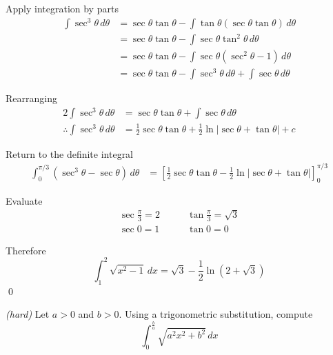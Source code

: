 \begin{solution}
    Apply integration by parts
    \begin{align*}
        \int \sec^3\theta\,d\theta
        &= \sec\theta\tan\theta-\int \tan\theta(\sec\theta\tan\theta)\,d\theta\\
        &= \sec\theta\tan\theta-\int \sec\theta\tan^2\theta\,d\theta\\
        &= \sec\theta\tan\theta-\int \sec\theta(\sec^2\theta-1)\,d\theta\\
        &= \sec\theta\tan\theta-\int \sec^3\theta\,d\theta+\int \sec\theta\,d\theta
    \end{align*}

    Rearranging
    \begin{align*}
        2\int \sec^3\theta\,d\theta
        &= \sec\theta\tan\theta+\int \sec\theta\,d\theta\\
        \therefore \int \sec^3\theta\,d\theta
        &= \frac{1}{2}\sec\theta\tan\theta+\frac{1}{2}\ln|\sec\theta+\tan\theta|+c
    \end{align*}

    Return to the definite integral
    \begin{align*}
        \int_{0}^{\pi/3}(\sec^3\theta-\sec\theta)\,d\theta
        &= \left[\frac{1}{2}\sec\theta\tan\theta-\frac{1}{2}\ln|\sec\theta+\tan\theta|\right]_{0}^{\pi/3}
    \end{align*}

    Evaluate
    \begin{align*}
        \sec\frac{\pi}{3}=2 &\qquad \tan\frac{\pi}{3}=\sqrt{3}\\
        \sec 0=1 &\qquad \tan 0=0
    \end{align*}

    Therefore
    \[
        \int_{1}^{2}\sqrt{x^2-1}\,dx
        = \sqrt{3}-\frac{1}{2}\ln(2+\sqrt{3})
    \]
    \qed
\end{solution}

\begin{example} \emph{(hard)}
    Let $a>0$ and $b>0$. Using a trigonometric substitution, compute
    \[
        \int_{0}^{\frac{b}{a}}\sqrt{a^2x^2+b^2}\,dx
    \]
\end{example}

